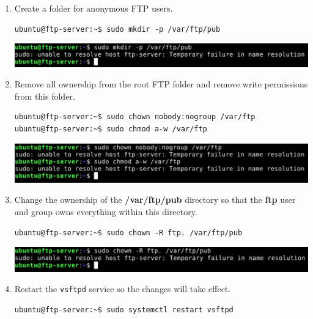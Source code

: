 \documentclass[letterpaper, 12pt]{article}
\begin{document}
\begin{enumerate}
    \item Create a folder for anonymous FTP users.
\begin{lstlisting}
ubuntu@ftp-server:~$ sudo mkdir -p /var/ftp/pub
\end{lstlisting}

    \begin{center}
        \includegraphics[width=\linewidth]{images/part1/step42.png}
    \end{center}

    \item Remove all ownership from the root FTP folder and remove write permissions from this folder.
\begin{lstlisting}
ubuntu@ftp-server:~$ sudo chown nobody:nogroup /var/ftp
ubuntu@ftp-server:~$ sudo chmod a-w /var/ftp
\end{lstlisting}

    \begin{center}
        \includegraphics[width=\linewidth]{images/part1/step43.png}
    \end{center}

    \item Change the ownership of the \textbf{/var/ftp/pub} directory so that the \textbf{ftp} user and group owns
    everything within this directory.
\begin{lstlisting}
ubuntu@ftp-server:~$ sudo chown -R ftp. /var/ftp/pub
\end{lstlisting}

    \begin{center}
        \includegraphics[width=\linewidth]{images/part1/step44.png}
    \end{center}

    \item Restart the \texttt{vsftpd} service so the changes will take effect.
\begin{lstlisting}
ubuntu@ftp-server:~$ sudo systemctl restart vsftpd
\end{lstlisting}


\end{enumerate}
\end{document}

